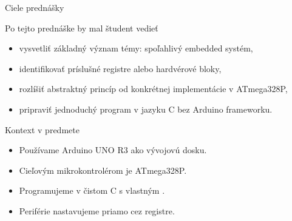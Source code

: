 
\begin{frame}{Ciele prednášky}
\begin{tukebox}{Po tejto prednáške by mal študent vedieť}
\begin{itemize}
    \item vysvetliť základný význam témy: spoľahlivý embedded systém,
    \item identifikovať príslušné registre alebo hardvérové bloky,
    \item rozlíšiť abstraktný princíp od konkrétnej implementácie v ATmega328P,
    \item pripraviť jednoduchý program v jazyku C bez Arduino frameworku.
\end{itemize}
\end{tukebox}
\end{frame}

\begin{frame}{Kontext v predmete}
\begin{itemize}
    \item Používame Arduino UNO R3 ako vývojovú dosku.
    \item Cieľovým mikrokontrolérom je ATmega328P.
    \item Programujeme v čistom C s vlastným .
    \item Periférie nastavujeme priamo cez registre.
\end{itemize}
\end{frame}
